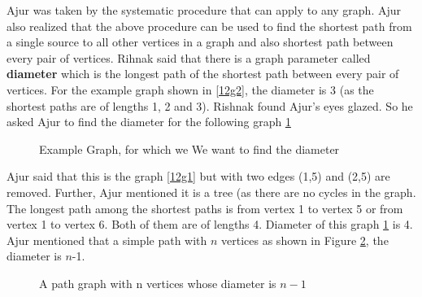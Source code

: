 Ajur was taken by the systematic procedure that can apply to any graph. Ajur also realized that the above procedure can be used to find the shortest path from a single source to all other vertices in a graph and also shortest path between every pair of vertices. Rihnak said that there is a graph parameter called \textbf{diameter} which is the longest path of the shortest path between every pair of vertices. For the example graph shown in \ref{12g2}, the diameter is 3 (as the shortest paths are of lengths 1, 2 and 3). Rishnak found Ajur's eyes glazed. So he asked Ajur to find the diameter for the following graph \ref{12g3}  

\begin{figure}
\begin{center}
\caption{ Example Graph, for which we We want to find the diameter }\label{12g3}
\end{center}
\end{figure}

Ajur said that this is the graph \ref{12g1} but with two edges (1,5) and (2,5) are removed. Further, Ajur mentioned it is a tree (as there are no cycles in the graph. The longest path among the shortest paths is from vertex 1 to vertex 5 or from vertex 1 to vertex 6. Both of them are of lengths 4. Diameter of this graph \ref{12g3} is 4. Ajur mentioned that a simple path with $n$ vertices as shown in Figure \ref{12g4}, the diameter is $n$-1.

\begin{figure}
\begin{center}
\caption{ A path graph with n vertices whose diameter is $n-1$ }\label{12g4}
\end{center}
\end{figure}

